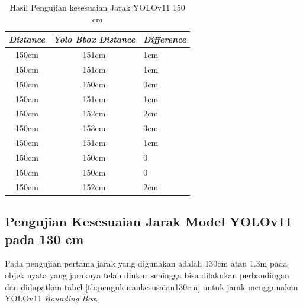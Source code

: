 \begin{table}[H]
  \centering
  \caption{Hasil Pengujian kesesuaian Jarak YOLOv11 150 cm}
  \label{tb:pengukurankesusaian150cm}
    \begin{tabular}{|c|c|l|}
    \hline
    \textit{Distance} & \textit{Yolo Bbox Distance} & \textit{Difference} \\ \hline
    150cm             & 151cm                       & 1cm                 \\ \hline
    150cm             & 151cm                       & 1cm                 \\ \hline
    150cm             & 150cm                       & 0cm                 \\ \hline
    150cm             & 151cm                       & 1cm                 \\ \hline
    150cm             & 152cm                       & 2cm                 \\ \hline
    150cm             & 153cm                       & 3cm                 \\ \hline
    150cm             & 151cm                       & 1cm                 \\ \hline
    150cm             & 150cm                       & 0                   \\ \hline
    150cm             & 150cm                       & 0                   \\ \hline
    150cm             & 152cm                       & 2cm                 \\ \hline
  \end{tabular}
\end{table}

  \subsection{Pengujian Kesesuaian Jarak Model YOLOv11 pada 130 cm}

  Pada pengujian pertama jarak yang digunakan adalah 130cm atau 1.3m pada objek nyata yang jaraknya telah diukur sehingga bisa dilakukan perbandingan dan didapatkan tabel \ref{tb:pengukurankesusaian130cm} untuk jarak menggunakan YOLOv11 \emph{Bounding Box}.
  
